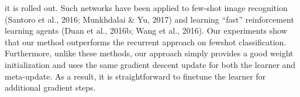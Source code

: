\documentclass{article}
\begin{document}
it is rolled out. Such networks have been applied to few-shot image recognition (Santoro et al., 2016; Munkhdalai & Yu, 2017) and learning “fast” reinforcement learning agents (Duan et al., 2016b; Wang et al., 2016). Our experiments show that our method outperforms the recurrent approach on fewshot classification. Furthermore, unlike these methods, our approach simply provides a good weight initialization and uses the same gradient descent update for both the learner and meta-update. As a result, it is straightforward to finetune the learner for additional gradient steps.%
\end{document}
